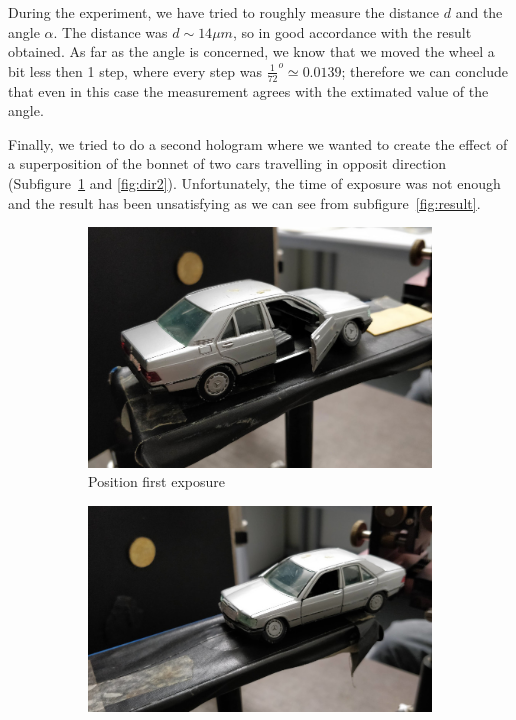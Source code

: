 \documentclass[11pt,a4paper]{article}
\begin{document}
During the experiment, we have tried to roughly measure the distance $d$ and the angle $\alpha$. The distance was $d\sim 14\mu m$, so in good accordance with the result obtained. As far as the angle is concerned, we know that we moved the wheel a bit less then 1 step, where every step was $\frac{1}{72}^o\simeq 0.0139$; therefore we can conclude that even in this case the measurement agrees with the extimated value of the angle.

Finally, we tried to do a second hologram where we wanted to create the effect of a superposition of the bonnet of two cars travelling in opposit direction (Subfigure~\ref{fig:dir1} and \ref{fig:dir2}). Unfortunately, the time of exposure was not enough and the result has been unsatisfying as we can see from subfigure~\ref{fig:result}.

\begin{figure}[ht]
\centering
\begin{subfigure}[b]{0.45\textwidth}
\includegraphics[width=\textwidth]{car_double_exposure_1}
\caption{Position first exposure}
\label{fig:dir1}
\end{subfigure}
\begin{subfigure}[b]{0.45\textwidth}
\includegraphics[width=\textwidth]{car_double_exposure_2}

\end{subfigure}
\end{figure}
\end{document}
